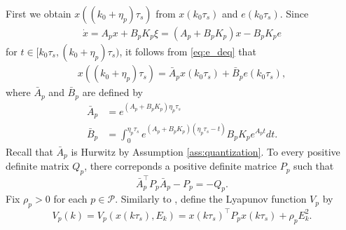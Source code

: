 \documentclass[letterpaper, 11pt, onecolumn]{ieeeconf}  \IEEEoverridecommandlockouts
\begin{document}
First we obtain $x((k_0+\eta_p)\tau_s)$ from $x(k_0\tau_s)$ and
$e(k_0\tau_s)$.
Since
\begin{align}
\label{eq:x_de_noswitch}
\dot x 
= A_p x + B_p K_p\xi 
= (A_p + B_pK_p) x - B_pK_p e
\end{align}
for $t \in  [k_0\tau_s, (k_0+\eta_p)\tau_s)$,
it follows from \eqref{eq:e_deq} that
\begin{align}
x((k_0+\eta_p)\tau_s) 
=
\bar A_p x(k_0\tau_s) + \bar B_p e(k_0\tau_s),
\label{x_t0+eta_tau}
\end{align}
where $\bar A_p$ and $\bar B_p$ are defined by
\begin{align*}
\bar A_p &= 
e^{(A_p+B_pK_p) \eta_p \tau_s} \\
\bar B_p &= 
\int^{\eta_p\tau_s}_{0}
e^{(A_p+B_pK_p)(\eta_p \tau_s - t)}
B_pK_p e^{A_p t} dt.
\end{align*}
Recall that $\bar A_p$ is Hurwitz by Assumption \ref{ass:quantization}.
To every positive definite matrix $Q_p$, 
there correponds a positive definite matrice $P_p$ such that
\begin{equation}
\label{eq:Lyapnov_equation}
\bar A_p ^{\top} P_p \bar A_p - P_p = -Q_p.
\end{equation}
Fix $\rho_p > 0$
for each $p \in \mathcal{P}$. Similarly to \cite{Liberzon2014},
define the Lyapunov function $V_p$ by
\begin{equation}
\label{eq:Lyapunov_def}
V_p(k) = 
V_p(x(k\tau_s),E_k)
= x(k\tau_s)^{\top}P_p x(k \tau_s) + \rho_p E_{k}^2.
\end{equation}
\end{document}
